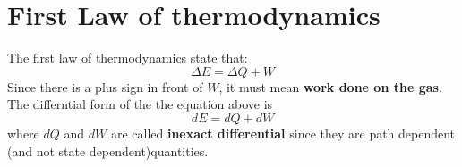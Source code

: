 
\section{First Law of thermodynamics}
The first law of thermodynamics state that:
\begin{equation}
    \Delta E= \Delta Q + W
\end{equation}
Since there is a plus sign in front of $W$, it must mean \textbf{work done on the gas}.
The differntial form of the the equation above is
\begin{equation}
    dE=dQ+dW
\end{equation}
where $dQ$ and $dW$ are called \textbf{inexact differential} since they are path dependent (and not state dependent)quantities.

